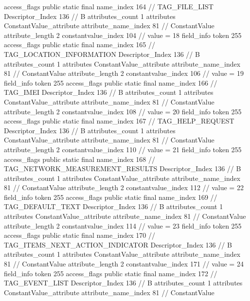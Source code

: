 {{{{{				access_flags	public static final
				name_index	164		// TAG_FILE_LIST
				Descriptor_Index	136		// B
				attributes_count	1
				attributes {
				ConstantValue_attribute {
					attribute_name_index	81		// ConstantValue
					attribute_length	2
					constantvalue_index	104		// value = 18
				}
				}
			}
			field_info {
				token	255
				access_flags	public static final
				name_index	165		// TAG_LOCATION_INFORMATION
				Descriptor_Index	136		// B
				attributes_count	1
				attributes {
				ConstantValue_attribute {
					attribute_name_index	81		// ConstantValue
					attribute_length	2
					constantvalue_index	106		// value = 19
				}
				}
			}
			field_info {
				token	255
				access_flags	public static final
				name_index	166		// TAG_IMEI
				Descriptor_Index	136		// B
				attributes_count	1
				attributes {
				ConstantValue_attribute {
					attribute_name_index	81		// ConstantValue
					attribute_length	2
					constantvalue_index	108		// value = 20
				}
				}
			}
			field_info {
				token	255
				access_flags	public static final
				name_index	167		// TAG_HELP_REQUEST
				Descriptor_Index	136		// B
				attributes_count	1
				attributes {
				ConstantValue_attribute {
					attribute_name_index	81		// ConstantValue
					attribute_length	2
					constantvalue_index	110		// value = 21
				}
				}
			}
			field_info {
				token	255
				access_flags	public static final
				name_index	168		// TAG_NETWORK_MEASUREMENT_RESULTS
				Descriptor_Index	136		// B
				attributes_count	1
				attributes {
				ConstantValue_attribute {
					attribute_name_index	81		// ConstantValue
					attribute_length	2
					constantvalue_index	112		// value = 22
				}
				}
			}
			field_info {
				token	255
				access_flags	public static final
				name_index	169		// TAG_DEFAULT_TEXT
				Descriptor_Index	136		// B
				attributes_count	1
				attributes {
				ConstantValue_attribute {
					attribute_name_index	81		// ConstantValue
					attribute_length	2
					constantvalue_index	114		// value = 23
				}
				}
			}
			field_info {
				token	255
				access_flags	public static final
				name_index	170		// TAG_ITEMS_NEXT_ACTION_INDICATOR
				Descriptor_Index	136		// B
				attributes_count	1
				attributes {
				ConstantValue_attribute {
					attribute_name_index	81		// ConstantValue
					attribute_length	2
					constantvalue_index	171		// value = 24
				}
				}
			}
			field_info {
				token	255
				access_flags	public static final
				name_index	172		// TAG_EVENT_LIST
				Descriptor_Index	136		// B
				attributes_count	1
				attributes {
				ConstantValue_attribute {
					attribute_name_index	81		// ConstantValue
}}}}}}}
